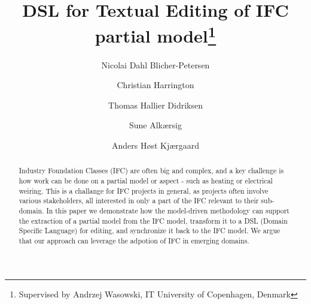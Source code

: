 \documentclass{llncs}
\begin{document}

\mainmatter              %
\title{DSL for Textual Editing of IFC partial model\thanks{Supervised by Andrzej Wasowski, IT University of Copenhagen, Denmark}}

\author{Nicolai Dahl Blicher-Petersen \and Christian Harrington \and
Thomas Hallier Didriksen \and Sune Alkærsig \and Anders Høst Kjærgaard\\}


\maketitle              %

\begin{abstract}
Industry Foundation Classes (IFC) are often big and complex, and a key challenge is how work can be done on a partial model or aspect - such as heating or electrical weiring. This is a challange for IFC projects in general, as projects often involve various stakeholders, all interested in only a part of the IFC relevant to their sub-domain. In this paper we demonstrate how the model-driven methodology can support the extraction of a partial model from the IFC model, transform it to a DSL (Domain Specific Language) for editing, and synchronize it back to the IFC model. We argue that our approach can leverage the adpotion of IFC in emerging domains.


\end{abstract}










\end{document}
